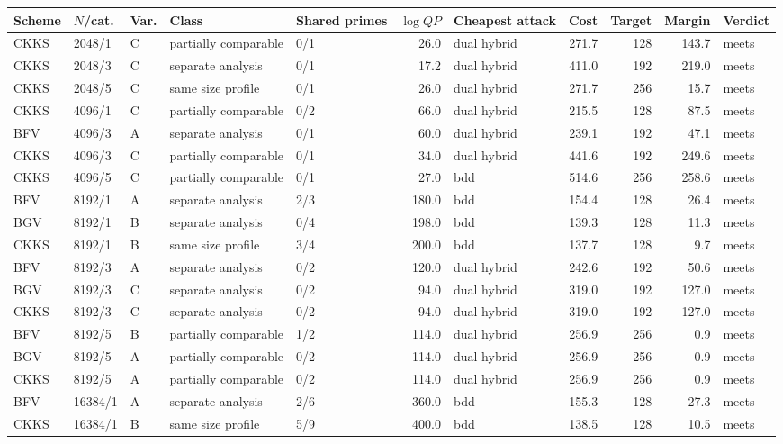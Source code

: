 \begin{longtable}{@{}lllllrlrrrl@{}}
\toprule
Scheme & $N$/cat. & Var. & Class & Shared primes & $\log QP$ & Cheapest attack & Cost & Target & Margin & Verdict \\
\midrule
\endhead
CKKS & 2048/1 & C & partially comparable & 0/1 & 26.0 & dual hybrid & 271.7 & 128 & 143.7 & meets \\
CKKS & 2048/3 & C & separate analysis & 0/1 & 17.2 & dual hybrid & 411.0 & 192 & 219.0 & meets \\
CKKS & 2048/5 & C & same size profile & 0/1 & 26.0 & dual hybrid & 271.7 & 256 & 15.7 & meets \\
CKKS & 4096/1 & C & partially comparable & 0/2 & 66.0 & dual hybrid & 215.5 & 128 & 87.5 & meets \\
BFV & 4096/3 & A & separate analysis & 0/1 & 60.0 & dual hybrid & 239.1 & 192 & 47.1 & meets \\
CKKS & 4096/3 & C & partially comparable & 0/1 & 34.0 & dual hybrid & 441.6 & 192 & 249.6 & meets \\
CKKS & 4096/5 & C & partially comparable & 0/1 & 27.0 & bdd & 514.6 & 256 & 258.6 & meets \\
BFV & 8192/1 & A & separate analysis & 2/3 & 180.0 & bdd & 154.4 & 128 & 26.4 & meets \\
BGV & 8192/1 & B & separate analysis & 0/4 & 198.0 & bdd & 139.3 & 128 & 11.3 & meets \\
CKKS & 8192/1 & B & same size profile & 3/4 & 200.0 & bdd & 137.7 & 128 & 9.7 & meets \\
BFV & 8192/3 & A & separate analysis & 0/2 & 120.0 & dual hybrid & 242.6 & 192 & 50.6 & meets \\
BGV & 8192/3 & C & separate analysis & 0/2 & 94.0 & dual hybrid & 319.0 & 192 & 127.0 & meets \\
CKKS & 8192/3 & C & separate analysis & 0/2 & 94.0 & dual hybrid & 319.0 & 192 & 127.0 & meets \\
BFV & 8192/5 & B & partially comparable & 1/2 & 114.0 & dual hybrid & 256.9 & 256 & 0.9 & meets \\
BGV & 8192/5 & A & partially comparable & 0/2 & 114.0 & dual hybrid & 256.9 & 256 & 0.9 & meets \\
CKKS & 8192/5 & A & partially comparable & 0/2 & 114.0 & dual hybrid & 256.9 & 256 & 0.9 & meets \\
BFV & 16384/1 & A & separate analysis & 2/6 & 360.0 & bdd & 155.3 & 128 & 27.3 & meets \\
CKKS & 16384/1 & B & same size profile & 5/9 & 400.0 & bdd & 138.5 & 128 & 10.5 & meets \\
\bottomrule
\end{longtable}

